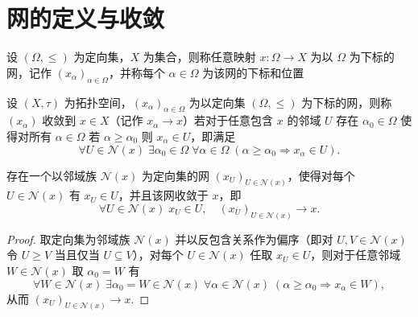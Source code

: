 \documentclass[lang=cn,a4paper,newtx,figureplace=section,tableplace=section]{elegantbook}
\begin{document}
\section{网的定义与收敛}

\begin{definition}[网]\label{def:net}设 $(\Omega,\leq)$ 为定向集，$X$ 为集合，则称任意映射 $x:\Omega\to X$ 为以 $\Omega$ 为下标的网，记作 $(x_{\alpha})_{\alpha\in \Omega}$，并称每个 $\alpha\in \Omega$ 为该网的下标和位置\end{definition}

\begin{definition}[网的收敛]\label{def:net-convergence}设 $(X,\tau)$ 为拓扑空间，$(x_{\alpha})_{\alpha\in \Omega}$ 为以定向集 $(\Omega,\le)$ 为下标的网，则称 $(x_{\alpha})$ 收敛到 $x\in X$（记作 $x_{\alpha}\to x$）若对于任意包含 $x$ 的邻域 $U$ 存在 $\alpha_0\in\Omega$ 使得对所有 $\alpha\in\Omega$ 若 $\alpha\ge \alpha_0$ 则 $x_{\alpha}\in U$，即满足 \begin{equation} \forall U\in\mathcal{N}(x)\;\exists \alpha_0\in\Omega\;\forall \alpha\in\Omega\; (\alpha\ge \alpha_0\Rightarrow x_{\alpha}\in U). \end{equation} \end{definition}

\begin{proposition}
    存在一个以邻域族 $\mathcal{N}(x)$ 为定向集的网 $(x_U)_{U\in\mathcal{N}(x)}$，使得对每个 $U\in\mathcal{N}(x)$ 有 $x_U\in U$，并且该网收敛于 $x$，即
\begin{equation}
\forall U\in\mathcal{N}(x)\; x_U\in U,\quad (x_U)_{U\in\mathcal{N}(x)}\to x.
\end{equation}
\end{proposition}
\begin{proof}
    取定向集为邻域族 $\mathcal{N}(x)$ 并以反包含关系作为偏序（即对 $U,V\in\mathcal{N}(x)$ 令 $U\ge V$ 当且仅当 $U\subseteq V$），对每个 $U\in\mathcal{N}(x)$ 任取 $x_U\in U$，则对于任意邻域 $W\in\mathcal{N}(x)$ 取 $\alpha_0=W$ 有
\begin{equation}
\forall W\in\mathcal{N}(x)\;\exists \alpha_0=W\in\mathcal{N}(x)\;\forall \alpha\in\mathcal{N}(x)\;(\alpha\ge \alpha_0\Rightarrow x_\alpha\in W),
\end{equation}
从而 $(x_U)_{U\in\mathcal{N}(x)}\to x$.
\end{proof}
\end{document}
